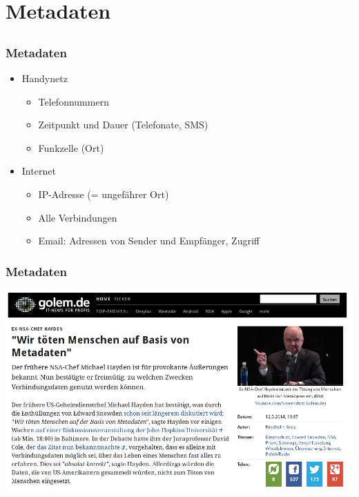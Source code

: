 \documentclass[12pt]{beamer}
\begin{document}
\section{Metadaten}
\subsection{}

\begin{frame}
  \frametitle{Metadaten}
  \begin{itemize}
    \item Handynetz
      \begin{itemize}
        \item Telefonnummern
        \item Zeitpunkt und Dauer (Telefonate, SMS)
        \item Funkzelle (Ort)
      \end{itemize}
    \item Internet
      \begin{itemize}
        \item IP-Adresse (= ungefährer Ort)
        \item Alle Verbindungen
        \item Email: Adressen von Sender und Empfänger, Zugriff
      \end{itemize}
  \end{itemize}
\end{frame}

\begin{frame}
    \frametitle{Metadaten}
    \begin{center}
      \includegraphics[height=0.7\textheight]{img/wekillpeople.jpg}
    \end{center}
\end{frame}
\end{document}
